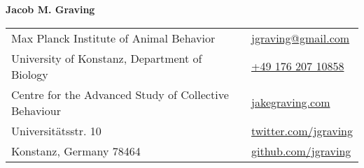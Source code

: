 \documentclass[letterpaper,10pt,oneside]{article}
\begin{document}

\LARGE{\textbf{Jacob M. Graving}}  \\
\normalsize



\begin{center}
\begin{tabular}{l l}
 Max Planck Institute of Animal Behavior		& \hspace{2in} \href{mailto:jgraving@gmail.com}{\faEnvelope{ } jgraving@gmail.com} \\
 University of Konstanz, Department of Biology	& \hspace{2in}  \href{tel:+4917620710858 }{\faPhone{ } +49 176 207 10858 }  \\
  Centre for the Advanced Study of Collective Behaviour    & \hspace{2in}  \href{http://jakegraving.com/}{\faGlobe{ } jakegraving.com}   \\
  Universit\"{a}tsstr. 10  & \hspace{2in}  \href{https://twitter.com/jgraving}{\faTwitter{ }  twitter.com/jgraving}   \\
   Konstanz, Germany 78464         & \hspace{2in} \href{https://github.com/jgraving}{\faGithub{ }  github.com/jgraving} \\
 
\end{tabular}
\end{center}
\end{document}
